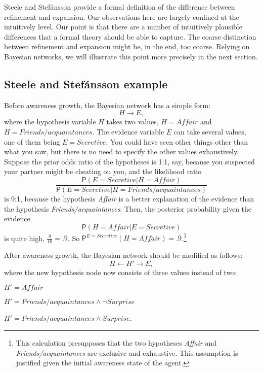 \documentclass[
  11pt,
  dvipsnames,enabledeprecatedfontcommands]{scrartcl}
\newcommand{\pr}[1]{\ensuremath{\mathsf{P}(#1)}}
\newcommand{\ppr}[2]{\ensuremath{\mathsf{P}^{#1}(#2)}}
\begin{document}
Steele and Stefánsson provide a formal definition of the difference
between refinement and expansion. Our observations here are largely
confined at the intuitively level. Our point is that there are a number
of intuitively plausible differences that a formal theory should be able
to capture. The coarse distinction between refinement and expansion
might be, in the end, too coarse. Relying on Bayesian networks, we will
illustrate this point more precisely in the next section.

\hypertarget{steele-and-stefuxe1nsson-example}{%
\subsection{Steele and Stefánsson
example}\label{steele-and-stefuxe1nsson-example}}

Before awareness growth, the Bayesian network has a simple form:
\[H \rightarrow E,\] where the hypothesis variable \(H\) takes two
values, \(H=\textit{Affair}\) and \(H=\textit{Friends/acquaintances}\).
The evidence variable \(E\) can take several values, one of them being
\(E=\textit{Secretive}\). You could have seen other things other than
what you saw, but there is no need to specify the other values
exhaustively. Suppose the prior odds ratio of the hypotheses is 1:1,
say, because you suspected your partner might be cheating on you, and
the likelihood ratio
\[\frac{\pr{E=\textit{Secretive}\vert H=\textit{Affair}}}{\pr{E=\textit{Secretive}\vert H=\textit{Friends/acquaintances}}}\]
is 9:1, because the hypothesis \textit{Affair} is a better explanation
of the evidence than the hypothesis \textit{Friends/acquaintances}.
Then, the posterior probability given the evidence
\[\pr{H=\textit{Affair} \vert E=\textit{Secretive}}\] is quite high,
\(\frac{9}{10}=.9\). So
\(\ppr{E=\textit{Secretive}}{H=\textit{Affair}}=.9\).\footnote{This
  calculation presupposes that the two hypotheses \textit{Affair} and
  \textit{Friends/acquaintances} are exclusive and exhaustive. This
  assumption is justified given the initial awareness state of the
  agent.}

After awareness growth, the Bayesian network should be modified as
follows: \[H \leftarrow H' \rightarrow E,\] where the new hypothesis
node now consists of three values instead of two:

\(H'=\textit{Affair}\)

\(H'=\textit{Friends/acquaintances}\wedge \neg \textit{Surprise}\)

\(H'=\textit{Friends/acquaintances}\wedge\textit{Surprise}\).
\end{document}
